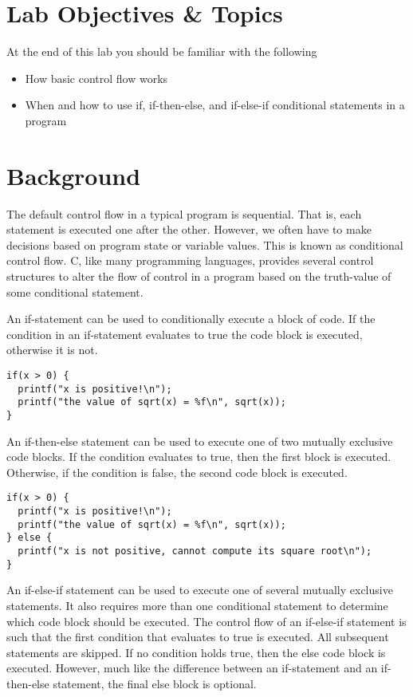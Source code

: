 \documentclass[12pt]{scrartcl}
\begin{document}
\section{Lab Objectives \& Topics}
At the end of this lab you should be familiar with the following
\begin{itemize}
  \item How basic control flow works
  \item When and how to use if, if-then-else, and if-else-if conditional 
  	statements in a program
\end{itemize}

\section{Background}

The default control flow in a typical program is sequential.  That is, 
each statement is executed one after the other.  However, we often 
have to make decisions based on program state or variable values.  
This is known as conditional control flow.  C, like many programming 
languages, provides several control structures to alter the flow of 
control in a program based on the truth-value of some conditional 
statement.

An if-statement can be used to conditionally execute a block of code.  
If the condition in an if-statement evaluates to true the code block is 
executed, otherwise it is not.

\begin{verbatim}
if(x > 0) {
  printf("x is positive!\n");
  printf("the value of sqrt(x) = %f\n", sqrt(x));
}
\end{verbatim}

An if-then-else statement can be used to execute one of two mutually 
exclusive code blocks.  If the condition evaluates to true, then the first 
block is executed.  Otherwise, if the condition is false, the second code 
block is executed. 

\begin{verbatim}
if(x > 0) {
  printf("x is positive!\n");
  printf("the value of sqrt(x) = %f\n", sqrt(x));
} else {
  printf("x is not positive, cannot compute its square root\n");
}
\end{verbatim}

An if-else-if statement can be used to execute one of several mutually 
exclusive statements.  It also requires more than one conditional 
statement to determine which code block should be executed.   The 
control flow of an if-else-if statement is such that the first condition that 
evaluates to true is executed.  All subsequent statements are skipped.  
If no condition holds true, then the else code block is executed.  
However, much like the difference between an if-statement and an 
if-then-else statement, the final else block is optional.
\end{document}
